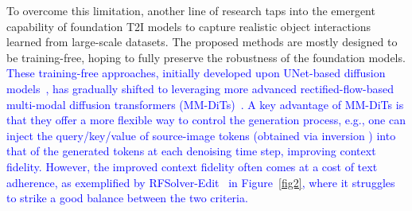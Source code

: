 \documentclass{article}
\newcommand{\kc}[1]{\textcolor{blue}{#1}}
\begin{document}
To overcome this limitation, another line of research taps into the emergent capability of foundation T2I models to capture realistic object interactions learned from large-scale datasets.
The proposed methods are mostly designed to be training-free, hoping to fully preserve the robustness of the foundation models.
\kc{These training-free approaches, initially developed upon UNet-based diffusion models~\citep{hertz2022prompt, cao2023masactrl, tumanyan2023plug}, has gradually shifted to leveraging more advanced rectified-flow-based multi-modal diffusion transformers (MM-DiTs)~\citep{rout2024semantic, wang2024taming, deng2024fireflow, tewel2025addit, zhu2025kv}.
A key advantage of MM-DiTs is that they offer a more flexible way to control the generation process, e.g., one can inject the query/key/value of source-image tokens (obtained via inversion \citep{deng2024fireflow,rout2024semantic,wang2024taming}) into that of the generated tokens at each denoising time step, improving context fidelity.}
\kc{However, the improved context fidelity often comes at a cost of text adherence, as exemplified by RFSolver-Edit~\citep{wang2024taming} in Figure~\ref{fig2}, where it struggles to strike a good balance between the two criteria.}
\end{document}
